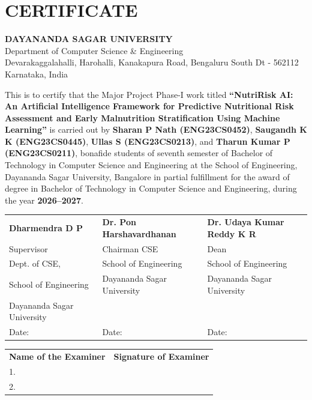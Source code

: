 \documentclass[12pt,a4paper]{report}
\begin{document}
\chapter*{CERTIFICATE}
\thispagestyle{plain}
\begin{center}
    {\Large\bfseries\color{dsublue} DAYANANDA SAGAR UNIVERSITY}\\
    {\normalsize Department of Computer Science \& Engineering}\\
    {\small Devarakaggalahalli, Harohalli, Kanakapura Road, Bengaluru South Dt - 562112\\Karnataka, India}
\end{center}
\vspace{12pt}

\noindent This is to certify that the Major Project Phase-I work titled \textbf{``NutriRisk AI: An Artificial Intelligence Framework for Predictive Nutritional Risk Assessment and Early Malnutrition Stratification Using Machine Learning''} is carried out by \textbf{Sharan P Nath (ENG23CS0452)}, \textbf{Saugandh K K (ENG23CS0445)}, \textbf{Ullas S (ENG23CS0213)}, and \textbf{Tharun Kumar P (ENG23CS0211)}, bonafide students of seventh semester of Bachelor of Technology in Computer Science and Engineering at the School of Engineering, Dayananda Sagar University, Bangalore in partial fulfillment for the award of degree in Bachelor of Technology in Computer Science and Engineering, during the year \textbf{2026--2027}.

\vspace{28pt}
\noindent
\begin{tabular}{@{}p{}p{}p{}@{}}
\textbf{Dharmendra D P} & \textbf{Dr. Pon Harshavardhanan} & \textbf{Dr. Udaya Kumar Reddy K R} \\
Supervisor & Chairman CSE & Dean \\
Dept. of CSE, & School of Engineering & School of Engineering \\
School of Engineering & Dayananda Sagar University & Dayananda Sagar University \\
Dayananda Sagar University & & \\[18pt]
Date: & Date: & Date:
\end{tabular}

\vspace{30pt}
\noindent
\begin{tabular}{@{}p{}p{}@{}}
\textbf{Name of the Examiner} & \textbf{Signature of Examiner} \\[16pt]
1. & \\[14pt]
2. &
\end{tabular}
\newpage
\end{document}
